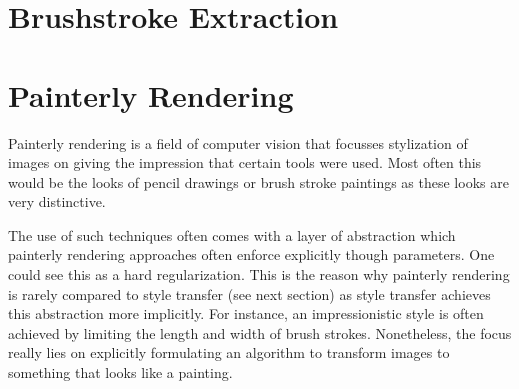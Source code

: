 








\section{Brushstroke Extraction}


\section{Painterly Rendering}


Painterly rendering is a field of computer vision that focusses stylization of images on giving the impression that certain tools were used.
Most often this would be the looks of pencil drawings or brush stroke paintings as these looks are very distinctive.

The use of such techniques often comes with a layer of abstraction which painterly rendering approaches often enforce explicitly though parameters.
One could see this as a hard regularization.
This is the reason why painterly rendering is rarely compared to style transfer (see next section) as style transfer achieves this abstraction more implicitly.
For instance, an impressionistic style is often achieved by limiting the length and width of brush strokes.
Nonetheless, the focus really lies on explicitly formulating an algorithm to transform images to something that looks like a painting.

